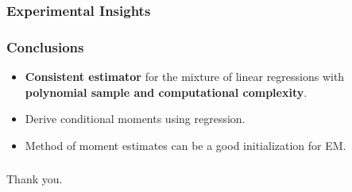 \documentclass[xcolor={svgnames}]{beamer}
\begin{document}
\begin{frame}
  \frametitle{Experimental Insights}


\end{frame}


\begin{frame}
  \frametitle{Conclusions}
  \begin{itemize}
    \item {\bf Consistent estimator} for the mixture of linear regressions with {\bf polynomial sample and computational complexity}.
    \item<2-> Derive conditional moments using regression.
    \item<3-> Method of moment estimates can be a good initialization for EM.
  \end{itemize}
\end{frame}

\begin{frame}
  \frametitle{}
    Thank you.
\end{frame}
\end{document}
